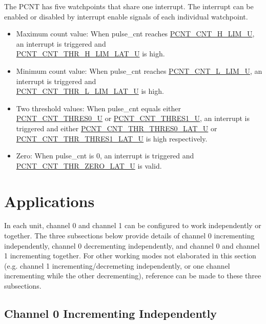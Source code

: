 \documentclass[main\_\_EN.tex]{subfiles}
\begin{document}
The PCNT has five watchpoints that share one interrupt. The interrupt can be enabled or disabled by interrupt enable signals of each individual watchpoint.

\begin{itemize}
    \item Maximum count value: When pulse\_cnt reaches \hyperref[fielddesc:PCNTCNTHLIMUN]{PCNT\_CNT\_H\_LIM\_U}, an interrupt is triggered and \\\hyperref[fielddesc:PCNTCNTTHRHLIMLATUN]{PCNT\_CNT\_THR\_H\_LIM\_LAT\_U} is high.
    \item Minimum count value: When pulse\_cnt reaches \hyperref[fielddesc:PCNTCNTLLIMUN]{PCNT\_CNT\_L\_LIM\_U}, an interrupt is triggered and \\\hyperref[fielddesc:PCNTCNTTHRLLIMLATUN]{PCNT\_CNT\_THR\_L\_LIM\_LAT\_U} is high.
    \item Two threshold values: When pulse\_cnt equals either \hyperref[fielddesc:PCNTCNTTHRES0UN]{PCNT\_CNT\_THRES0\_U} or \hyperref[fielddesc:PCNTCNTTHRES1UN]{PCNT\_CNT\_THRES1\_U}, an interrupt is triggered and either \hyperref[fielddesc:PCNTCNTTHRTHRES0LATUN]{PCNT\_CNT\_THR\_THRES0\_LAT\_U} or \hyperref[fielddesc:PCNTCNTTHRTHRES1LATUN]{PCNT\_CNT\_THR\_THRES1\_LAT\_U} is high respectively.
    \item Zero: When pulse\_cnt is 0, an interrupt is triggered and \hyperref[fielddesc:PCNTCNTTHRZEROLATUN]{PCNT\_CNT\_THR\_ZERO\_LAT\_U} is valid.
\end{itemize}

\section{Applications}

In each unit, channel 0 and channel 1 can be configured to work independently or together. The three subsections below provide details of channel 0 incrementing independently, channel 0 decrementing independently, and channel 0 and channel 1 incrementing together. For other working modes not elaborated in this section (e.g. channel 1 incrementing/decremeting independently, or one channel incrementing while the other decrementing), reference can be made to these three subsections.

\subsection{Channel 0 Incrementing Independently} \label{Subsection:one channel inc}
\end{document}
